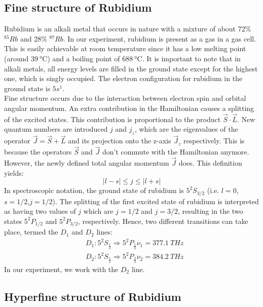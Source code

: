 \documentclass{article}
\begin{document}
\subsection{Fine structure of Rubidium}
Rubidium is an alkali metal that occurs in nature with a mixture of about 72\% $^{85}Rb$ and 28\% $^{87}Rb$. In our experiment, rubidium is present as a gas in a gas cell. This is easily achievable at room temperature since it has a low melting point (around $\SI{39}{\celsius}$) and a boiling point of $\SI{688}{\celsius}$. It is important to note that in alkali metals, all energy levels are filled in the ground state except for the highest one, which is singly occupied. The electron configuration for rubidium in the ground state is $5s^1$. 
\\
Fine structure occurs due to the interaction between electron spin and orbital angular momentum. An extra contribution in the Hamiltonian causes a splitting of the excited states. This contribution is proportional to the product $\vec{S}\cdot\vec{L}$. New quantum numbers are introduced $j$ and $j_z$, which are the eigenvalues of the operator $\vec{J}= \vec{S}+\vec{L}$ and its projection onto the z-axis $\vec{J}_z$ respectively. This is because the operators $\vec{S}$ and $\vec{J}$ don't commute with the Hamiltonian anymore. However, the newly defined total angular momentum $\vec{J}$ does. This definition yields: 
\begin{equation}
    |l-s| \leq j \leq|l+s|
\end{equation}
In spectroscopic notation, the ground state of rubidium is $5^2S_{3/2}$ (i.e. $l=0$,$s=1/2$,$j = 1/2$). The splitting of the first excited state of rubidium is interpreted as having two values of $j$ which are $j =1/2$ and $j =3/2$, resulting in the two states $5^2P_{1/2}$ and $5^2P_{3/2}$, respectively. Hence, two different transitions can take place, termed the $D_1$ and $D_2$ lines: 
\begin{equation}
    \begin{aligned}
& D_1: 5^2 S_{\frac{1}{2}} \Rightarrow 5^2 P_{\frac{1}{2}} \nu_{1}=\SI{377.1}{THz} \\
& D_2: 5^2 S_{\frac{1}{2}} \Rightarrow 5^2 P_{\frac{3}{2}} \nu_{2}=\SI{384.2}{THz} 
\end{aligned}
\end{equation}
In our experiment, we work with the $D_2$ line. 

\subsection{Hyperfine structure of Rubidium}
\end{document}
